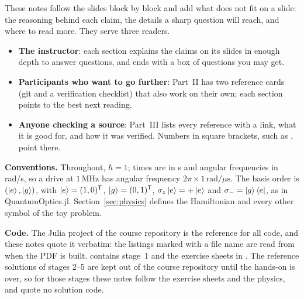 \begin{note}
These notes follow the slides block by block and add what does not fit on a slide:
the reasoning behind each claim, the details a sharp question will reach, and where
to read more. They serve three readers.
\begin{itemize}
  \item \textbf{The instructor}: each section explains the claims on its slides in
        enough depth to answer questions, and ends with a box of questions you may get.
  \item \textbf{Participants who want to go further}: Part~II has two reference cards
        (git and a verification checklist) that also work on their own; each section
        points to the best next reading.
  \item \textbf{Anyone checking a source}: Part~III lists every reference with a link,
        what it is good for, and how it was verified. Numbers in square brackets, such
        as , point there.
\end{itemize}
\end{note}

\textbf{Conventions.} Throughout, $\hbar = 1$; times are in \textmu s and angular
frequencies in rad/\textmu s, so a drive at $1$\,MHz has angular frequency
$2\pi \times 1\,\mathrm{rad}/\mu\mathrm{s}$. The basis order is $(\ket{e}, \ket{g})$,
with $\ket{e} = (1, 0)^{\mathsf{T}}$, $\ket{g} = (0, 1)^{\mathsf{T}}$,
$\sigma_z\ket{e} = +\ket{e}$ and $\sigma_- = \ket{g}\bra{e}$, as in QuantumOptics.jl.
Section~\ref{sec:physics} defines the Hamiltonian and every other symbol of the toy
problem.

\textbf{Code.} The Julia project  of the course repository is the
reference for all code, and these notes quote it verbatim: the listings marked with a file
name are read from  when the PDF is built.  contains
stage~1 and the exercise sheets in . The reference solutions of stages 2--5
are kept out of the course repository until the hands-on is over, so for those stages
these notes follow the exercise sheets and the physics, and quote no solution code.
